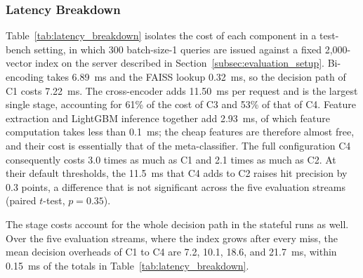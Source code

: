 \documentclass[authoryear,preprint,review,12pt]{elsarticle}
\begin{document}
\subsubsection{Latency Breakdown}
\label{subsubsec:latency_breakdown}
Table~\ref{tab:latency_breakdown} isolates the cost of each component in a test-bench setting, in which 300 batch-size-1 queries are issued against a fixed 2,000-vector index on the server described in Section~\ref{subsec:evaluation_setup}. Bi-encoding takes 6.89~ms and the FAISS lookup 0.32~ms, so the decision path of C1 costs 7.22~ms. The cross-encoder adds 11.50~ms per request and is the largest single stage, accounting for 61\% of the cost of C3 and 53\% of that of C4. Feature extraction and LightGBM inference together add 2.93~ms, of which feature computation takes less than 0.1~ms; the cheap features are therefore almost free, and their cost is essentially that of the meta-classifier. The full configuration C4 consequently costs 3.0 times as much as C1 and 2.1 times as much as C2. At their default thresholds, the 11.5~ms that C4 adds to C2 raises hit precision by 0.3 points, a difference that is not significant across the five evaluation streams (paired $t$-test, $p=0.35$).

\begin{table}[htbp]
\centering
\caption{Fixed-index component microbenchmark: 300 batch-size-1 queries against a 2,000-vector index on the RTX 4090 server. Generation, insertion, and index growth are excluded.}
\label{tab:latency_breakdown}
\end{table}

The stage costs account for the whole decision path in the stateful runs as well. Over the five evaluation streams, where the index grows after every miss, the mean decision overheads of C1 to C4 are 7.2, 10.1, 18.6, and 21.7~ms, within 0.15~ms of the totals in Table~\ref{tab:latency_breakdown}.
\end{document}
